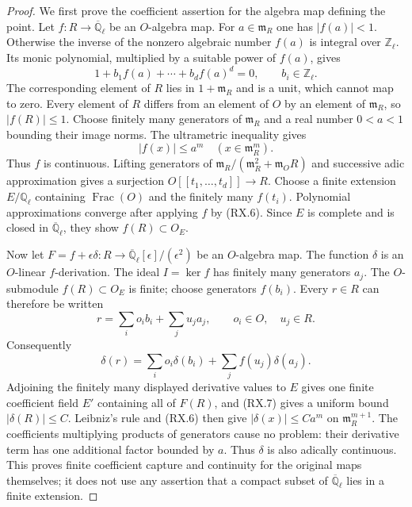 \begin{proof}
We first prove the coefficient assertion for the algebra map defining the
point.  Let $f:R\to\overline{\mathbb Q}_\ell$ be an $O$-algebra map.
For $a\in\mathfrak m_R$ one has $|f(a)|<1$.  Otherwise the inverse of
the nonzero algebraic number $f(a)$ is integral over $\mathbb Z_\ell$.
Its monic polynomial, multiplied by a suitable power of $f(a)$, gives
\[
              1+b_1f(a)+\cdots+b_df(a)^d=0,
                   \qquad b_i\in\mathbb Z_\ell.
 \tag{RX.5}
\]
The corresponding element of $R$ lies in $1+\mathfrak m_R$ and is a
unit, which cannot map to zero.  Every element of $R$ differs from an
element of $O$ by an element of $\mathfrak m_R$, so $|f(R)|\le1$.
Choose finitely many generators of $\mathfrak m_R$ and a real number
$0<a<1$ bounding their image norms.  The ultrametric inequality gives
\[
                 |f(x)|\le a^m\quad(x\in\mathfrak m_R^m).
 \tag{RX.6}
\]
Thus $f$ is continuous.  Lifting generators of
$\mathfrak m_R/(\mathfrak m_R^2+\mathfrak m_O R)$ and successive
adic approximation gives a surjection $O[[t_1,\ldots,t_d]]\to R$.
Choose a finite extension $E/\mathbb Q_\ell$ containing
$\operatorname{Frac}(O)$ and the finitely many $f(t_i)$.
Polynomial approximations converge after applying $f$ by (RX.6).
Since $E$ is complete and is closed in $\overline{\mathbb Q}_\ell$,
they show $f(R)\subset O_E$.

Now let $F=f+\epsilon\delta:R\to
\overline{\mathbb Q}_\ell[\epsilon]/(\epsilon^2)$ be an $O$-algebra
map.  The function $\delta$ is an $O$-linear $f$-derivation.
The ideal $I=\ker f$ has finitely many generators $a_j$.
The $O$-submodule $f(R)\subset O_E$ is finite; choose generators
$f(b_i)$.  Every $r\in R$ can therefore be written
\[
             r=\sum_i o_i b_i+\sum_j u_j a_j,
                      \qquad o_i\in O,\quad u_j\in R.
\]
Consequently
\[
             \delta(r)=\sum_i o_i\delta(b_i)
                         +\sum_j f(u_j)\delta(a_j).
 \tag{RX.7}
\]
Adjoining the finitely many displayed derivative values to $E$ gives one
finite coefficient field $E'$ containing all of $F(R)$, and (RX.7)
gives a uniform bound $|\delta(R)|\le C$.
Leibniz's rule and (RX.6) then give
$|\delta(x)|\le Ca^m$ on $\mathfrak m_R^{m+1}$.
The coefficients multiplying products of generators cause no problem:
their derivative term has one additional factor bounded by $a$.
Thus $\delta$ is also adically continuous.  This proves finite
coefficient capture and continuity for the original maps themselves;
it does not use any assertion that a compact subset of
$\overline{\mathbb Q}_\ell$ lies in a finite extension.


\end{proof}
